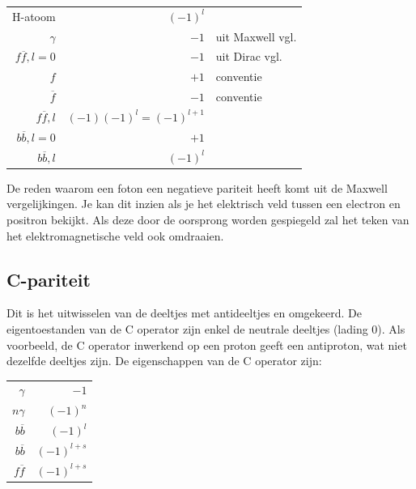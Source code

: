 \documentclass[../main.tex]{subfiles}
\begin{document}
\begin{table}[h]
    \centering
    \label{tab:par_eig}
    \begin{tabular}{r|rl}
        H-atoom             & $(-1)^l$                  &                   \\
        $\gamma$            & $-1$                      & uit Maxwell vgl.  \\
        $f\overline f,l=0$  & $-1$                      & uit Dirac vgl.    \\
        $f$                 & $+1$                      & conventie         \\
        $\overline f$       & $-1$                      & conventie         \\
        $f\overline f,l$    & $(-1)(-1)^l=(-1)^{l+1}$   &                   \\
        $b\overline b,l=0$  & $+1$                      &                   \\
        $b\overline b,l$    & $(-1)^l$                  &                   \\
    \end{tabular}
\end{table}

De reden waarom een foton een negatieve pariteit heeft komt uit de Maxwell vergelijkingen. Je kan dit inzien als je het elektrisch veld tussen een electron en positron bekijkt. Als deze door de oorsprong worden gespiegeld zal het teken van het elektromagnetische veld ook omdraaien.

\subsection{C-pariteit}%
\label{sub:c_pariteit}

Dit is het uitwisselen van de deeltjes met antideeltjes en omgekeerd. De eigentoestanden van de C operator zijn enkel de neutrale deeltjes (lading 0). Als voorbeeld, de C operator inwerkend op een proton geeft een antiproton, wat niet dezelfde deeltjes zijn. De eigenschappen van de C operator zijn:
\newpage

\begin{table}[h]
    \centering
    \label{tab:c_eig}
    \begin{tabular}{r|r}
        $\gamma$        & $-1$          \\
        $n\gamma$       & $(-1)^n$      \\
        $b \overline b$ & $(-1)^{l}$  \\
        $b \overline b$ & $(-1)^{l+s}$  \\
        $f \overline f$ & $(-1)^{l+s}$  \\
    \end{tabular}
\end{table}
\end{document}
